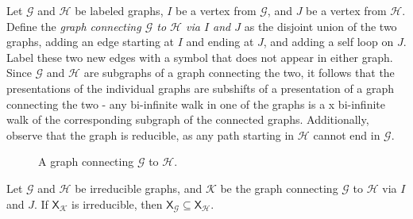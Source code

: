 \documentclass[hidelinks]{article}
\newcommand{\Gc}{\mathcal{G}}  %
\newcommand{\Hc}{\mathcal{H}}  %
\newcommand{\Kc}{\mathcal{K}}
\newcommand{\shift}[1]{\mathsf{X}_{#1}}
\newcommand{\term}[1]{\textit{#1}}
\theoremstyle{definition}
\begin{document}
    Let \(\Gc\) and \(\Hc\) be labeled graphs, \(I\) be a vertex from \(\Gc\), and \(J\) 
    be a vertex from \(\Hc\). Define the \term{graph connecting \(\Gc\) to \(\Hc\) via \(I\) and \(J\)} 
    as the disjoint union of the two graphs, adding an edge starting at \(I\) and ending at \(J\), 
    and adding a self loop on \(J\). Label these two new edges with a symbol that 
    does not appear in either graph. 
    Since \(\Gc\) and \(\Hc\) are subgraphs of a graph connecting the two,
    it follows that the presentations of the individual graphs are subshifts of a presentation 
    of a graph connecting the two - any bi-infinite walk in one of the graphs is a x
    bi-infinite walk of the corresponding subgraph of the connected graphs.
    Additionally, observe that the graph is reducible,
    as any path starting in \(\Hc\) cannot end in \(\Gc\).
    

    \begin{figure}[ht]
        \centering

        \caption{A graph connecting \(\Gc\) to \(\Hc\).}
    \end{figure}

    \begin{theorem}
        Let \(\Gc\) and \(\Hc\) be irreducible graphs, and \(\Kc\) be the graph connecting 
        \(\Gc\) to \(\Hc\) via \(I\) and \(J\).
        If \(\shift{\Kc}\) is irreducible, then
        \(\shift{\Gc} \subseteq \shift{\Hc}\).
    \end{theorem}
\end{document}
